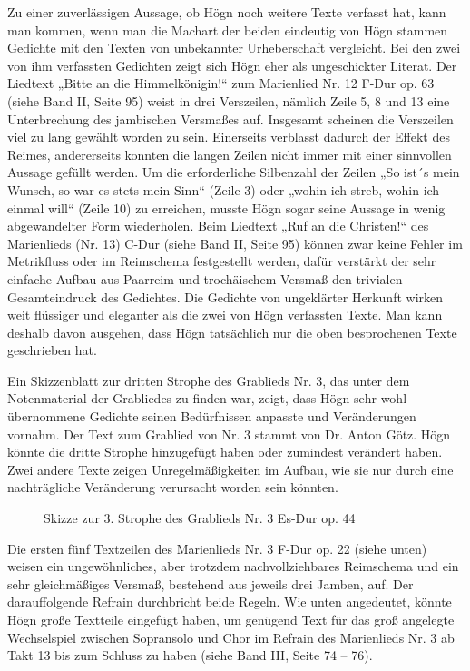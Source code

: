 Zu einer zuverlässigen Aussage, ob Högn noch weitere Texte verfasst hat,
kann man kommen, wenn man die Machart der beiden eindeutig von Högn
stammen Gedichte mit den Texten von unbekannter Urheberschaft
vergleicht. Bei den zwei von ihm verfassten Gedichten zeigt sich Högn
eher als ungeschickter Literat. Der Liedtext „Bitte an die
Himmelkönigin!“ zum Marienlied Nr. 12 F-Dur op. 63 (siehe Band II,
Seite 95) weist in drei Verszeilen, nämlich Zeile 5, 8 und 13 eine
Unterbrechung des jambischen Versmaßes auf. Insgesamt scheinen die
Verszeilen viel zu lang gewählt worden zu sein. Einerseits verblasst
dadurch der Effekt des Reimes, andererseits konnten die langen Zeilen
nicht immer mit einer sinnvollen Aussage gefüllt werden. Um die
erforderliche Silbenzahl der Zeilen „So ist´s mein Wunsch, so war es
stets mein Sinn“ (Zeile 3) oder „wohin ich streb, wohin ich einmal
will“ (Zeile 10) zu erreichen, musste Högn sogar seine Aussage in wenig
abgewandelter Form wiederholen. Beim Liedtext „Ruf an die Christen!“
des Marienlieds (Nr. 13) C-Dur (siehe Band II, Seite 95) können zwar
keine Fehler im Metrikfluss oder im Reimschema festgestellt werden,
dafür verstärkt der sehr einfache Aufbau aus Paarreim und trochäischem
Versmaß den trivialen Gesamteindruck des Gedichtes. Die Gedichte von
ungeklärter Herkunft wirken weit flüssiger und eleganter als die zwei
von Högn verfassten Texte. Man kann deshalb davon ausgehen, dass Högn
tatsächlich nur die oben besprochenen Texte geschrieben hat.

Ein Skizzenblatt zur dritten Strophe des Grablieds Nr. 3, das unter dem
Notenmaterial der Grabliedes zu finden war, zeigt, dass Högn sehr wohl
übernommene Gedichte seinen Bedürfnissen anpasste und Veränderungen
vornahm. Der Text zum Grablied von Nr. 3 stammt von Dr. Anton Götz.
Högn könnte die dritte Strophe hinzugefügt haben oder zumindest
verändert haben. Zwei andere Texte zeigen Unregelmäßigkeiten im Aufbau,
wie sie nur durch eine nachträgliche Veränderung verursacht worden sein
könnten.

\begin{figure}
\caption{Skizze zur 3. Strophe des Grablieds Nr. 3 Es-Dur op. 44}
\end{figure}

Die ersten fünf Textzeilen des Marienlieds Nr. 3 F-Dur op. 22 (siehe
unten) weisen ein ungewöhnliches, aber trotzdem nachvollziehbares
Reimschema und ein sehr gleichmäßiges Versmaß, bestehend aus jeweils
drei Jamben, auf. Der darauffolgende Refrain durchbricht beide Regeln.
Wie unten angedeutet, könnte Högn große Textteile eingefügt haben, um
genügend Text für das groß angelegte Wechselspiel zwischen Sopransolo
und Chor im Refrain des Marienlieds Nr. 3 ab Takt 13 bis zum Schluss zu
haben (siehe Band III, Seite 74 – 76).

